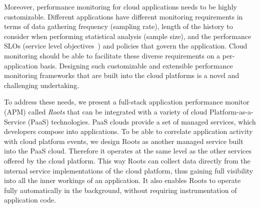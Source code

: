 Moreover, performance monitoring for cloud applications needs to be highly customizable. Different
applications have different monitoring requirements in terms of data gathering frequency (sampling rate), 
length of the history to consider when performing statistical analysis (sample size), and the performance 
SLOs (service level objectives~\cite{Keller:2003:WFS:635430.635442}) and policies that govern the application.
Cloud monitoring should be able to facilitate these diverse requirements on a
per-application basis.
Designing such customizable and extensible performance
monitoring frameworks that are built into the cloud platforms is a novel and challenging undertaking.

To address these needs, we present a full-stack application performance
monitor (APM) called \textit{Roots} that can be integrated
with a variety of cloud Platform-as-a-Service (PaaS) technologies. 
PaaS clouds provide a set of managed services, which developers compose into applications.
To be able to correlate application activity with cloud platform events,
we design Roots as another managed service built into the PaaS cloud. 
Therefore it operates at the same level as the other services offered by the cloud platform. 
This way Roots can collect data
directly from the internal service implementations of the cloud platform, thus gaining full visibility into all the 
inner workings of an application. It also enables Roots to operate fully automatically in the background, without
requiring instrumentation of application code. 

